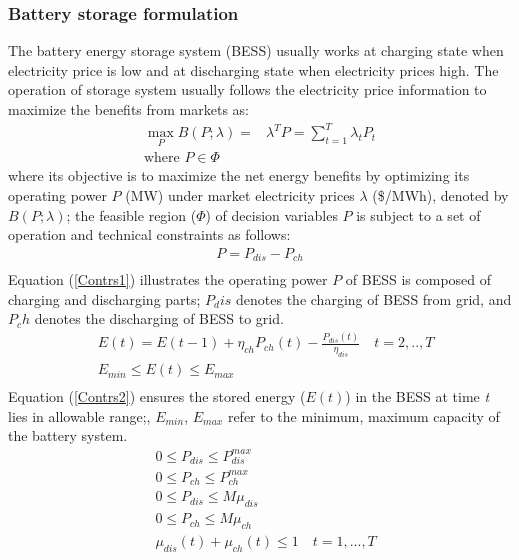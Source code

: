 \documentclass[journal]{IEEEtran}
\begin{document}
\subsubsection{Battery storage formulation}
The battery energy storage system (BESS) usually works at charging state when electricity price is low and at discharging state when electricity prices high. The operation of storage system usually follows the electricity price information to maximize the benefits from markets as:
\begin{equation}
  \label{ESbigM}
  \begin{aligned}
    \max_{P} B(P; \lambda) = &\lambda^T P = \sum_{t=1}^T \lambda_t P_t \\
    \text{where }  P \in \Phi
  \end{aligned}
\end{equation}
where its objective is to maximize the net energy benefits by optimizing its operating power $P$ (MW) under market electricity prices $\lambda$ (\$/MWh), denoted by $B(P; \lambda)$; the feasible region ($\Phi$) of decision variables $P$ is subject to a set of operation and technical constraints as follows:
\begin{equation}
  \label{Contrs1}
  \begin{aligned}
    P = P_{dis} - P_{ch} \\
  \end{aligned}
\end{equation}
Equation (\ref{Contrs1}) illustrates the operating power $P$ of BESS is composed of charging and discharging parts; $P_dis$ denotes the charging of BESS from grid, and $P_ch$ denotes the discharging of BESS to grid.
\begin{equation}
  \label{Contrs2}
  \begin{aligned}
    &E(t) = E(t-1) + \eta_{ch} P_{ch}(t) - \frac{P_{dis}(t)}{\eta_{dis}} \quad t=2,..,T\\
    &E_{min} \leq E(t) \leq E_{max} \\
  \end{aligned}
\end{equation}
Equation (\ref{Contrs2}) ensures the stored energy ($E(t)$) in the BESS at time \textit{t} lies in allowable range;, $E_{min}$, $E_{max}$ refer to the minimum, maximum capacity of the battery system.
\begin{equation}
  \label{Contrs3}
  \begin{aligned}
    & 0 \leq P_{dis} \leq P_{dis}^{max} \\
    & 0 \leq P_{ch} \leq P_{ch}^{max}  \\
    & 0 \leq P_{dis} \leq M \mu_{dis}   \\
    & 0 \leq P_{ch} \leq M \mu_{ch}     \\
    & \mu_{dis}(t) + \mu_{ch}(t) \leq 1 \quad t=1,...,T\\
  \end{aligned}
\end{equation}
\end{document}

